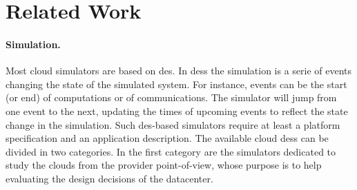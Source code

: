 \documentclass[]{llncs}
\begin{document}
\section{Related Work}
\label{sec:relworks}

\paragraph{Simulation.} Most cloud simulators  are based on \ac{des}. In \aclp{des}  the simulation is a
serie  of events  changing the  state of  the simulated  system.  For  instance,
events can  be the  start (or  end) of computations  or of  communications.  The
simulator will jump from  one event to the next, updating  the times of upcoming
events  to reflect  the state  change  in the  simulation.  Such  \ac{des}-based
simulators  require  at  least  a  platform  specification  and  an  application
description.  %
%
The available  cloud \acp{des} can  be divided in  two categories. In  the first
category are  the simulators  dedicated to  study the  clouds from  the provider
point-of-view, whose purpose  is to help evaluating the design  decisions of the
datacenter. 
\end{document}
